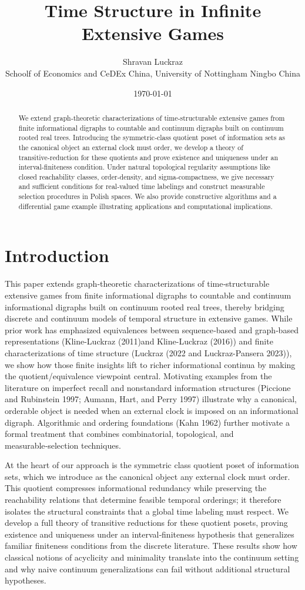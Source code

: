 \documentclass[11pt]{article}
\title{Time Structure in Infinite Extensive Games}
\author{Shravan Luckraz \\ Schoolf of Economics and CeDEx China, University of Nottingham Ningbo China}
\date{\today}
\begin{document}
\maketitle

\begin{abstract}
We extend graph‑theoretic characterizations of time‑structurable extensive games from finite informational digraphs to countable and continuum digraphs built on continuum rooted real trees. Introducing the symmetric‑class quotient poset of information sets as the canonical object an external clock must order, we develop a theory of transitive‑reduction for these quotients and prove existence and uniqueness under an interval‑finiteness condition. Under natural topological regularity assumptions like closed reachability classes, order‑density, and sigma‑compactness, we give necessary and sufficient conditions for real‑valued time labelings and construct measurable selection procedures in Polish spaces. We also provide constructive algorithms and a differential game example illustrating applications and computational implications.
\end{abstract}


\section{Introduction}
This paper extends graph‑theoretic characterizations of time‑structurable extensive games from finite informational digraphs to countable and continuum informational digraphs built on continuum rooted real trees, thereby bridging discrete and continuum models of temporal structure in extensive games. While prior work has emphasized equivalences between sequence‑based and graph‑based representations (Kline-Luckraz (2011)and Kline-Luckraz (2016)) and finite characterizations of time structure (Luckraz (2022 and Luckraz-Pansera 2023)), we show how those finite insights lift to richer informational continua by making the quotient/equivalence viewpoint central. Motivating examples from the literature on imperfect recall and nonstandard information structures (Piccione and Rubinstein 1997; Aumann, Hart, and Perry 1997) illustrate why a canonical, orderable object is needed when an external clock is imposed on an informational digraph. Algorithmic and ordering foundations (Kahn 1962) further motivate a formal treatment that combines combinatorial, topological, and measurable‑selection techniques.

At the heart of our approach is the symmetric class quotient poset of information sets, which we introduce as the canonical object any external clock must order. This quotient compresses informational redundancy while preserving the reachability relations that determine feasible temporal orderings; it therefore isolates the structural constraints that a global time labeling must respect. We develop a full theory of transitive reductions for these quotient posets, proving existence and uniqueness under an interval‑finiteness hypothesis that generalizes familiar finiteness conditions from the discrete literature. These results show how classical notions of acyclicity and minimality translate into the continuum setting and why naive continuum generalizations can fail without additional structural hypotheses.
\end{document}
